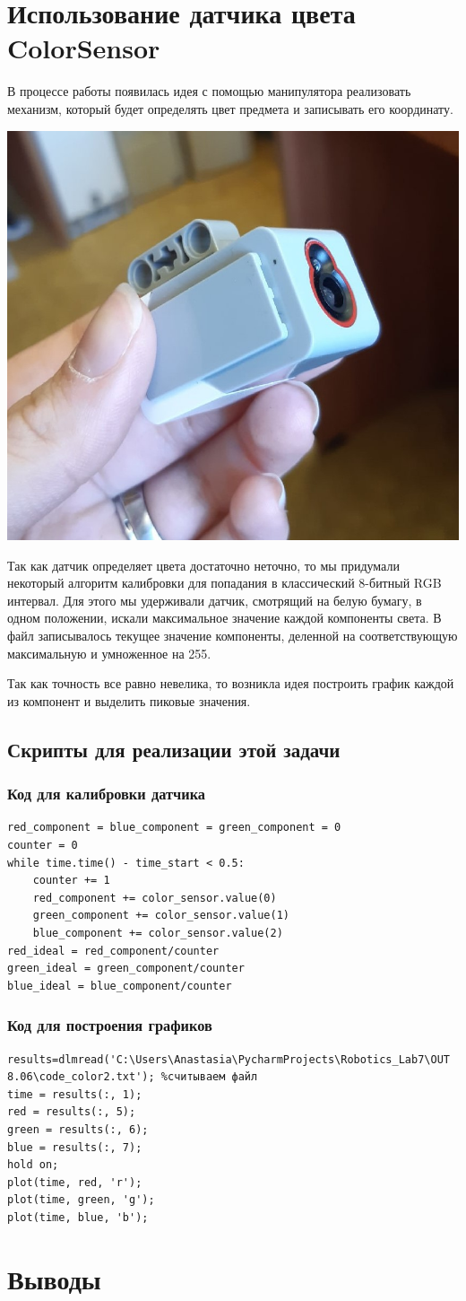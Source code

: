 \documentclass{article}
\begin{document}
\section{Использование датчика цвета ColorSensor}
\par В процессе работы появилась идея с помощью манипулятора реализовать механизм, который будет определять цвет предмета и записывать его координату. \\
\parbox[b][4 cm][t]{50 mm}{
\vspace{0.5 cm}
    \centering
    \includegraphics[width=.2\textwidth]{color_sensor.jpg}
}
\parbox[b][4 cm][t]{100 mm}{
  \vspace{0.5 cm}
\par Так как датчик определяет цвета достаточно неточно, то мы придумали некоторый алгоритм калибровки для попадания в классический 8-битный RGB интервал. Для этого мы удерживали датчик, смотрящий на белую бумагу, в одном положении, искали максимальное значение каждой компоненты света. В файл записывалось текущее значение компоненты, деленной на соответствующую максимальную и умноженное на 255. 
}
\par
Так как точность все равно невелика, то возникла идея построить график каждой из компонент и выделить пиковые значения. 
\subsection{Скрипты для реализации этой задачи}
\subsubsection*{Код для калибровки датчика}
\begin{verbatim}
red_component = blue_component = green_component = 0
counter = 0
while time.time() - time_start < 0.5:
    counter += 1
    red_component += color_sensor.value(0)
    green_component += color_sensor.value(1)
    blue_component += color_sensor.value(2)
red_ideal = red_component/counter
green_ideal = green_component/counter
blue_ideal = blue_component/counter
\end{verbatim}
\subsubsection*{Код для построения графиков}
\begin{verbatim}
results=dlmread('C:\Users\Anastasia\PycharmProjects\Robotics_Lab7\OUT 8.06\code_color2.txt'); %считываем файл
time = results(:, 1);
red = results(:, 5);
green = results(:, 6);
blue = results(:, 7);
hold on;
plot(time, red, 'r');
plot(time, green, 'g');
plot(time, blue, 'b');
\end{verbatim}



\section{Выводы}
\end{document}
